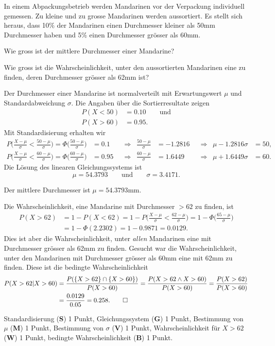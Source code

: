 In einem Abpackungsbetrieb werden Mandarinen vor der Verpackung
individuell gemessen.
Zu kleine und zu grosse Mandarinen werden aussortiert.
Es stellt sich heraus, dass 10\% der Mandarinen einen Durchmesser
kleiner als 50mm Durchmesser haben und 5\% einen Durchmesser grösser als 60mm.
\begin{teilaufgaben}
\item
Wie gross ist der mittlere Durchmesser einer Mandarine?
\item
Wie gross ist die Wahrscheinlichkeit, unter den aussortierten 
Mandarinen eine zu finden, deren Durchmesser grösser als 62mm ist?
\end{teilaufgaben}

\begin{loesung}
Der Durchmesser einer Mandarine ist normalverteilt mit Erwartungswert
$\mu$ und Standardabweichung $\sigma$.
Die Angaben über die Sortierresultate zeigen
\begin{align*}
P(X<50) &= 0.10 \qquad\text{und}\\
P(X>60) &= 0.95.
\end{align*}
Mit Standardisierung erhalten wir
\begin{align*}
P\biggl(\frac{X-\mu}{\sigma} < \frac{50-\mu}{\sigma}\biggr)
=
\Phi\biggl(\frac{50-\mu}{\sigma}\biggr)
&= 0.1
&&\Rightarrow&
\frac{50-\mu}{\sigma} 
&=
-1.2816
&&\Rightarrow&
\mu
-1.2816\sigma&=
50,
\\
P\biggl(\frac{X-\mu}{\sigma} < \frac{60-\mu}{\sigma}\biggr)
=
\Phi\biggl(\frac{60-\mu}{\sigma}\biggr)
&= 0.95
&&\Rightarrow&
\frac{60-\mu}{\sigma}
&=
1.6449
&&\Rightarrow&
\mu+1.6449\sigma
&=
60.
\end{align*}
Die Lösung des linearen Gleichungssystems ist
\[
\mu = 54.3793
\qquad\text{und}\qquad
\sigma = 3.4171.
\]
\begin{teilaufgaben}
\item
Der mittlere Durchmesser ist $\mu=54.3793\text{mm}$.
\item
Die Wahrscheinlichkeit, eine Mandarine mit Durchmesser $>62$ 
zu finden, ist
\begin{align*}
P(X>62)
&=
1-P(X<62)
=
1-P\biggl(\frac{X-\mu}{\sigma} < \frac{62-\mu}{\sigma}\biggr)
=
1-\Phi\biggl(\frac{65-\mu}{\sigma}\biggr)
\\
&=
1-\Phi(2.2302)
=
1-0.9871
=
0.0129.
\end{align*}
Dies ist aber die Wahrscheinlichkeit, unter {\em allen} Mandarinen
eine mit Durchmesser grösser als 62mm zu finden.
Gesucht war die Wahrscheinlichkeit, unter den Mandarinen mit
Durchmesser grösser als 60mm eine mit 62mm zu finden.
Diese ist die bedingte Wahrscheinlichkeit
\begin{align*}
P(X > 62 | X > 60)
&=
\frac{P(\{X>62\}\cap\{X>60\})}{P(X>60)}
=
\frac{P(X>62\wedge X>60)}{P(X>60)}
=
\frac{P(X>62)}{P(X>60)}
\\
&=
\frac{0.0129}{0.05}
=
0.258.
\qedhere
\end{align*}
\end{teilaufgaben}
\end{loesung}

\begin{bewertung}
Standardisierung ({\bf S}) 1 Punkt,
Gleichungssystem ({\bf G}) 1 Punkt,
Bestimmung von $\mu$ ({\bf M}) 1 Punkt,
Bestimmung von $\sigma$ ({\bf V}) 1 Punkt,
Wahrscheinlichkeit für $X>62$ ({\bf W}) 1 Punkt,
bedingte Wahrscheinlichkeit ({\bf B}) 1 Punkt.
\end{bewertung}



